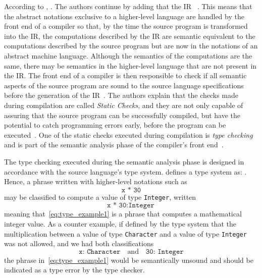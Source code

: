 \documentclass[
  oneside,
  english,
  coorientadorbanca,
  noabntexcite
]{ufsc-thesis-rn46-2019}
\newcommand{\code}[1]{\texttt{#1}}
\begin{document}
According to \textcite{appel2003modern}, .
The authors continue by adding that the IR ~\cite{appel2003modern}.
This means that the abstract notations exclusive to a higher-level language are handled by the front end of a compiler so that, by the time the source program is transformed into the IR, the computations described by the IR are semantic equivalent to the computations described by the source program but are now in the notations of an abstract machine language.
Although the semantics of the computations are the same, there may be semantics in the higher-level language that are not present in the IR.\@
The front end of a compiler is then responsible to check if all semantic aspects of the source program are sound to the source language specifications before the generation of the IR~\cite{Aho:2006:CPT:1177220}.
The authors explain that the checks made during compilation are called \textit{Static Checks}, and they are not only capable of assuring that the source program can be successfully compiled, but have the potential to catch programming errors early, before the program can be executed~\cite{Aho:2006:CPT:1177220}. One of the static checks executed during compilation is \textit{type checking} and is part of the semantic analysis phase of the compiler's front end~\cite{appel2003modern}.

The type checking executed during the semantic analysis phase is designed in accordance with the source language's type system.
\textcite{pierce2002types} defines a type system as: .
Hence, a phrase written with higher-level notations such as
\begin{equation}\label{eq:type_example1}
  \code{x * 30}
\end{equation}
may be classified to compute a value of type \code{Integer}, written
\begin{equation*}
  \code{x * 30}:\code{Integer}
\end{equation*}
meaning that~\ref{eq:type_example1} is a phrase that computes a mathematical integer value.
As a counter example, if defined by the type system that the multiplication between a value of type \code{Character} and a value of type \code{Integer} was not allowed, and we had both classifications
\begin{equation*}
  \code{x: Character} \quad \textrm{and} \quad \code{30: Integer}
\end{equation*}
the phrase in~\ref{eq:type_example1} would be semantically unsound and should be indicated as a type error by the type checker.
\end{document}
